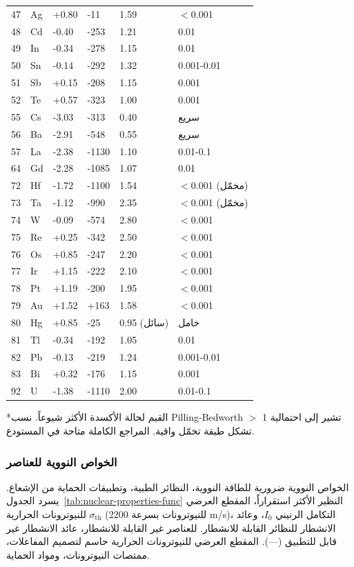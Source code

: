 \documentclass[11pt,a4paper]{article}
\begin{document}
\begin{otherlanguage}{arabic}
\begin{longtable}{p{0.8cm}p{1.2cm}p{2.5cm}p{2.5cm}p{2.5cm}p{2.5cm}}
			47 & Ag & +0.80 & -11 & 1.59 & $<$0.001 \\
			48 & Cd & -0.40 & -253 & 1.21 & 0.01 \\
			49 & In & -0.34 & -278 & 1.15 & 0.01 \\
			50 & Sn & -0.14 & -292 & 1.32 & 0.001-0.01 \\
			51 & Sb & +0.15 & -208 & 1.15 & 0.001 \\
			52 & Te & +0.57 & -323 & 1.00 & 0.001 \\
			55 & Cs & -3.03 & -313 & 0.40 & سريع \\
			56 & Ba & -2.91 & -548 & 0.55 & سريع \\
			57 & La & -2.38 & -1130 & 1.10 & 0.01-0.1 \\
			64 & Gd & -2.28 & -1085 & 1.07 & 0.01 \\
			72 & Hf & -1.72 & -1100 & 1.54 & $<$0.001 (مخمّل) \\
			73 & Ta & -1.12 & -990 & 2.35 & $<$0.001 (مخمّل) \\
			74 & W  & -0.09 & -574 & 2.80 & $<$0.001 \\
			75 & Re & +0.25 & -342 & 2.50 & $<$0.001 \\
			76 & Os & +0.85 & -247 & 2.20 & $<$0.001 \\
			77 & Ir & +1.15 & -222 & 2.10 & $<$0.001 \\
			78 & Pt & +1.19 & -200 & 1.95 & $<$0.001 \\
			79 & Au & +1.52 & +163 & 1.58 & $<$0.001 \\
			80 & Hg & +0.85 & -25 & 0.95 (سائل) & خامل \\
			81 & Tl & -0.34 & -192 & 1.05 & 0.01 \\
			82 & Pb & -0.13 & -219 & 1.24 & 0.001-0.01 \\
			83 & Bi & +0.32 & -176 & 1.15 & 0.001 \\
			92 & U  & -1.38 & -1110 & 2.00 & 0.01-0.1 \\
			\bottomrule
		\end{longtable}
		*القيم لحالة الأكسدة الأكثر شيوعاً. نسب Pilling-Bedworth $>$ 1 تشير إلى احتمالية تشكل طبقة تخمّل واقية. المراجع الكاملة متاحة في المستودع.
		
		\subsubsection{الخواص النووية للعناصر}
		\label{subsec:nuclear-properties-func}
		
		الخواص النووية ضرورية للطاقة النووية، النظائر الطبية، وتطبيقات الحماية من الإشعاع. يسرد الجدول~\ref{tab:nuclear-properties-func} النظير الأكثر استقراراً، المقطع العرضي للنيوترونات الحرارية \(\sigma_{\text{th}}\) (للنيوترونات بسرعة 2200 m/s)، التكامل الرنيني \(I_0\)، وعائد الانشطار للنظائر القابلة للانشطار. للعناصر غير القابلة للانشطار، عائد الانشطار غير قابل للتطبيق (---). المقطع العرضي للنيوترونات الحرارية حاسم لتصميم المفاعلات، ممتصات النيوترونات، ومواد الحماية.
		

\end{otherlanguage}
\end{document}

